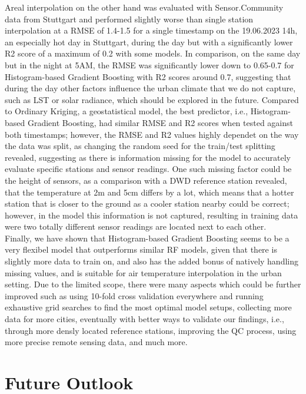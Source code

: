 Areal interpolation on the other hand was evaluated with Sensor.Community data from Stuttgart and performed slightly worse than single station interpolation at a RMSE of 1.4-1.5 for a single timestamp on the 19.06.2023 14h, an especially hot day in Stuttgart, during the day but with a significantly lower R2 score of a maximum of 0.2 with some models. In comparison, on the same day but in the night at 5AM, the RMSE was significantly lower down to 0.65-0.7 for Histogram-based Gradient Boosting with R2 scores around 0.7, suggesting that during the day other factors influence the urban climate that we do not capture, such as LST or solar radiance, which should be explored in the future. Compared to Ordinary Kriging, a geostatistical model, the best predictor, i.e., Histogram-based Gradient Boosting, had similar RMSE and R2 scores when tested against both timestamps; however, the RMSE and R2 values highly dependet on the way the data was split, as changing the random seed for the train/test splitting revealed, suggesting as there is information missing for the model to accurately evaluate specific stations and sensor readings. One such missing factor could be the height of sensors, as a comparison with a DWD reference station revealed, that the temperature at 2m and 5cm differs by a lot, which means that a hotter station that is closer to the ground as a cooler station nearby could be correct; however, in the model this information is not captured, resulting in training data were two totally different sensor readings are located next to each other.\\
Finally, we have shown that Histogram-based Gradient Boosting seems to be a very flexibel model that outperforms similar RF models, given that there is slightly more data to train on, and also has the added bonus of natively handling missing values, and is suitable for air temperature interpolation in the urban setting. Due to the limited scope, there were many aspects which could be further improved such as using 10-fold cross validation everywhere and running exhaustive grid searches to find the most optimal model setups, collecting more data for more cities, eventually with better ways to validate our findings, i.e., through more densly located reference stations, improving the QC process, using more precise remote sensing data, and much more.

\section{Future Outlook}

